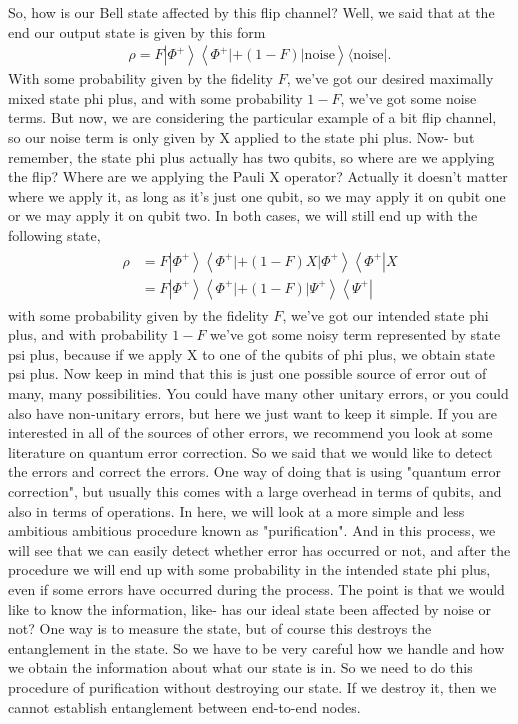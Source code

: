 So, how is our Bell state affected by this flip channel? Well, we said that at the end our output state is given by this form
\begin{align}
    \rho=F\left|\Phi^{+}\right\rangle\left\langle\Phi^{+}|+(1-F)| \text {noise}\right\rangle\langle\text{noise}|.
\end{align}
With some probability given by the fidelity $F$, we've got our desired maximally mixed state phi plus, and with some probability $1-F$, we've got some noise terms. But now, we are considering the particular example of a bit flip channel, so our noise term is only given by X applied to the state phi plus. Now- but remember, the state phi plus actually has two qubits, so where are we applying the flip? Where are we applying the Pauli X operator? Actually it doesn't matter where we apply it, as long as it's just one qubit, so we may apply it on qubit one or we may apply it on qubit two. In both cases, we will still end up with the following state,
\begin{align}
\begin{aligned}
\rho &=F\left|\Phi^{+}\right\rangle\left\langle\Phi^{+}|+(1-F) X| \Phi^{+}\right\rangle\left\langle\Phi^{+}\right| X \\
&=F\left|\Phi^{+}\right\rangle\left\langle\Phi^{+}|+(1-F)| \Psi^{+}\right\rangle\left\langle\Psi^{+}\right|
\end{aligned}
\end{align}
with some probability given by the fidelity $F$, we've got our intended state phi plus, and with probability $1-F$ we've got some noisy term represented by state psi plus, because if we apply X to one of the qubits of phi plus, we obtain state psi plus. Now keep in mind that this is just one possible source of error out of many, many possibilities. You could have many other unitary errors, or you could also have non-unitary errors, but here we just want to keep it simple. If you are interested in all of the sources of other errors, we recommend you look at some literature on quantum error correction. So we said that we would like to detect the errors and correct the errors. One way of doing that is using "quantum error correction", but usually this comes with a large overhead in terms of qubits, and also in terms of operations. In here, we will look at a more simple and less ambitious ambitious procedure known as "purification". And in this process, we will see that we can easily detect whether error has occurred or not, and after the procedure we will end up with some probability in the intended state phi plus, even if some errors have occurred during the process. The point is that we would like to know the information, like- has our ideal state been affected by noise or not? One way is to measure the state, but of course this destroys the entanglement in the state. So we have to be very careful how we handle and how we obtain the information about what our state is in. So we need to do this procedure of purification without destroying our state. If we destroy it, then we cannot establish entanglement between end-to-end nodes.

